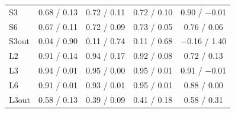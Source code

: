 \begin{tabular}{@{}lcccccccc@{}}
S3 & \multicolumn{2}{c}{0.68 / 0.13} & \multicolumn{2}{c}{0.72 / 0.11} & \multicolumn{2}{c}{0.72 / 0.10} & \multicolumn{2}{c}{0.90 / $-$0.01} \\
S6 & \multicolumn{2}{c}{0.67 / 0.11} & \multicolumn{2}{c}{0.72 / 0.09} & \multicolumn{2}{c}{0.73 / 0.05} & \multicolumn{2}{c}{0.76 / 0.06} \\
S3out & \multicolumn{2}{c}{0.04 / 0.90} & \multicolumn{2}{c}{0.11 / 0.74} & \multicolumn{2}{c}{0.11 / 0.68} & \multicolumn{2}{c}{$-$0.16 / 1.40} \\
L2 & \multicolumn{2}{c}{0.91 / 0.14} & \multicolumn{2}{c}{0.94 / 0.17} & \multicolumn{2}{c}{0.92 / 0.08} & \multicolumn{2}{c}{0.72 / 0.13} \\
L3 & \multicolumn{2}{c}{0.94 / 0.01} & \multicolumn{2}{c}{0.95 / 0.00} & \multicolumn{2}{c}{0.95 / 0.01} & \multicolumn{2}{c}{0.91 / $-$0.01} \\
L6 & \multicolumn{2}{c}{0.91 / 0.01} & \multicolumn{2}{c}{0.93 / 0.01} & \multicolumn{2}{c}{0.95 / 0.01} & \multicolumn{2}{c}{0.88 / 0.00} \\
L3out & \multicolumn{2}{c}{0.58 / 0.13} & \multicolumn{2}{c}{0.39 / 0.09} & \multicolumn{2}{c}{0.41 / 0.18} & \multicolumn{2}{c}{0.58 / 0.31} \\
\bottomrule
\end{tabular}
